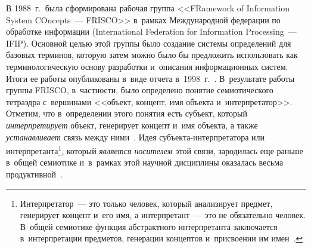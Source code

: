 {\begin{multicols}{2}
      В 1988~г.\ была сформирована рабочая группа <<FRamework of Information System 
COncepts~--- FRISCO>> в~рамках Международной федерации по обработке информации 
(International Federation for Information Processing~--- IFIP). Основной целью этой группы 
было создание системы определений для базовых терминов, которую затем можно было бы 
предложить использовать как терминологическую основу разработки и~описания 
информационных систем. Итоги ее работы опубликованы в~виде отчета 
      в~1998~г.~\cite{17-zat}. В~результате работы группы FRISCO, в~частности, было 
определено понятие семиотического тетраэдра с~вершинами <<объект, концепт, имя 
объекта и~интерпретатор>>. Отметим, что в~определении этого понятия есть субъект, 
который \textit{интерпретирует} объект, генерирует концепт и~имя объекта, а также 
\textit{устанавливает} связь между ними~\cite{18-zat}. Идея 
      субъ\-ек\-та-ин\-тер\-пре\-та\-то\-ра или интерпретанта\footnote{Интерпретатор~--- это 
только человек, который анализирует предмет, генерирует концепт и~его имя, а интерпретант~--- это не 
обязательно человек. В~общей семиотике функция абстрактного интерпретанта заключается в~интерпретации 
предметов, генерации концептов и~присвоении им имен~\cite[с.~15, 16]{19-zat}.}, который \textit{является 
носителем} этой связи, зародилась еще раньше в~общей семиотике и~в~рамках этой 
научной дисциплины оказалась весьма продуктивной~\cite{19-zat, 20-zat}.
      

\end{multicols}}
